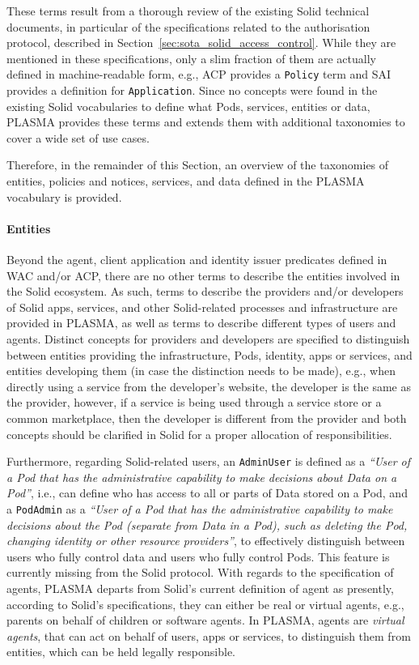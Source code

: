 These terms result from a thorough review of the existing Solid technical documents, in particular of the specifications related to the authorisation protocol, described in Section~\ref{sec:sota_solid_access_control}.
While they are mentioned in these specifications, only a slim fraction of them are actually defined in machine-readable form, e.g., ACP provides a \texttt{Policy} term and SAI provides a definition for \texttt{Application}.
Since no concepts were found in the existing Solid vocabularies to define what Pods, services, entities or data, PLASMA provides these terms and extends them with additional taxonomies to cover a wide set of use cases.

Therefore, in the remainder of this Section, an overview of the taxonomies of entities, policies and notices, services, and data defined in the PLASMA vocabulary is provided.

\paragraph{Entities}
Beyond the agent, client application and identity issuer predicates defined in WAC and/or ACP, there are no other terms to describe the entities involved in the Solid ecosystem.
As such, terms to describe the providers and/or developers of Solid apps, services, and other Solid-related processes and infrastructure are provided in PLASMA, as well as terms to describe different types of users and agents.
Distinct concepts for providers and developers are specified to distinguish between entities providing the infrastructure, Pods, identity, apps or services, and entities developing them (in case the distinction needs to be made), e.g., when directly using a service from the developer's website, the developer is the same as the provider, however, if a service is being used through a service store or a common marketplace, then the developer is different from the provider and both concepts should be clarified in Solid for a proper allocation of responsibilities.

Furthermore, regarding Solid-related users, an \texttt{AdminUser} is defined as a \textit{``User of a Pod that has the administrative capability to make decisions about Data on a Pod''}, i.e., can define who has access to all or parts of Data stored on a Pod, and a \texttt{PodAdmin} as a \textit{``User of a Pod that has the administrative capability to make decisions about the Pod (separate from Data in a Pod), such as deleting the Pod, changing identity or other resource providers''}, to effectively distinguish between users who fully control data and users who fully control Pods. This feature is currently missing from the Solid protocol.
With regards to the specification of agents, PLASMA departs from Solid's current definition of agent as presently, according to Solid's specifications, they can either be real or virtual agents, e.g., parents on behalf of children or software agents.
In PLASMA, agents are \textit{virtual agents}, that can act on behalf of users, apps or services, to distinguish them from entities, which can be held legally responsible.

